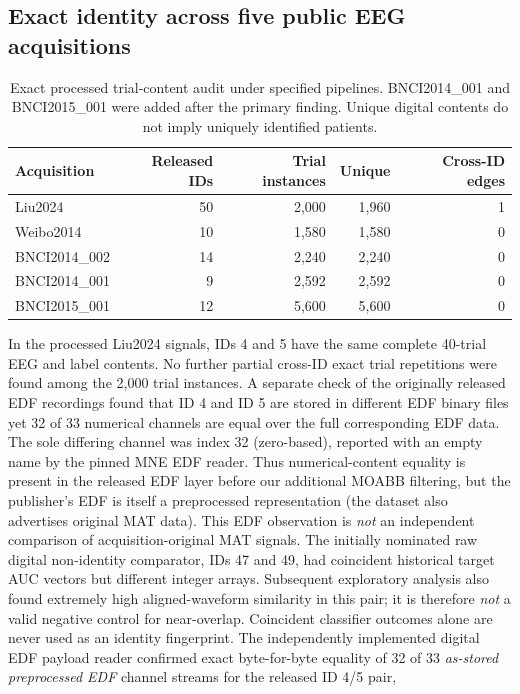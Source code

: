 \documentclass[11pt,a4paper]{article}
\begin{document}
\subsection{Exact identity across five public EEG acquisitions}
\begin{table}[ht]\centering\small
\caption{Exact processed trial-content audit under
specified pipelines. BNCI2014\_001 and BNCI2015\_001
were added after the primary finding. Unique digital
contents do not imply uniquely identified patients.}
\begin{tabular}{lrrrr}
\toprule
Acquisition & Released IDs & Trial instances & Unique & Cross-ID edges\\\midrule
Liu2024 &50&2,000&1,960&1\\
Weibo2014 &10&1,580&1,580&0\\
BNCI2014\_002 &14&2,240&2,240&0\\
BNCI2014\_001 &9&2,592&2,592&0\\
BNCI2015\_001 &12&5,600&5,600&0\\
\bottomrule
\end{tabular}\end{table}
In the processed Liu2024 signals, IDs 4 and 5 have the same complete
40-trial EEG and label contents. No further partial cross-ID exact
trial repetitions were found among the 2,000 trial instances.
A separate check of the originally released EDF recordings found
that ID 4 and ID 5 are stored in different EDF binary files yet
32 of 33 numerical channels are equal over the full corresponding
EDF data. The sole differing channel was index 32 (zero-based),
reported with an empty name by the pinned MNE EDF reader.
Thus numerical-content equality is present in the
released EDF layer before our additional MOABB filtering,
but the publisher's EDF is itself a preprocessed
representation (the dataset also advertises original MAT data).
This EDF observation is \emph{not} an independent
comparison of acquisition-original MAT signals. The initially nominated raw digital non-identity comparator,
IDs 47 and 49, had coincident historical target AUC vectors
but different integer arrays. Subsequent exploratory analysis
also found extremely high aligned-waveform similarity in this
pair; it is therefore \emph{not} a valid negative control for
near-overlap. Coincident classifier outcomes alone are never
used as an identity fingerprint.
The independently implemented digital EDF payload reader
confirmed exact byte-for-byte equality of 32 of 33
\emph{as-stored preprocessed EDF} channel streams
for the released ID 4/5 pair,
\end{document}
